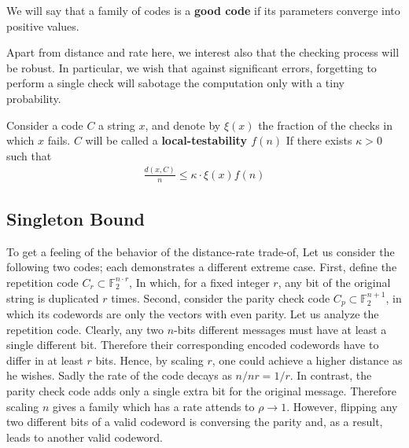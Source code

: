   \begin{definition} \label{good-code} We will say that a family of codes is a \textbf{good code} if its parameters converge into positive values. 
  \end{definition}

  Apart from distance and rate here, we interest also that the checking process will be robust. In particular,  we wish that against significant errors, forgetting to perform a single check will sabotage the computation only with a tiny probability.  
  \begin{definition} \label{LTC} Consider a code $C$  a string $x$, and denote by $\xi\left( x \right)$ the fraction of the checks in which $x$ fails. $C$ will be called a \textbf{local-testability $f\left( n \right)$} If there exists $\kappa > 0$ such that 
  \begin{equation*}
    \begin{split}
      \frac{d\left( x, C \right)}{n} \le \kappa \cdot  \xi\left( x \right) f\left( n \right)
    \end{split}
  \end{equation*}
\end{definition}
  

  \subsection{Singleton Bound}  
  To get a feeling of the behavior of the distance-rate trade-of, Let us consider the following two codes; each demonstrates a different extreme case. First, define the repetition code $C_{r} \subset \mathbb{F}_{2}^{n \cdot r}$, In which, for a fixed integer $r$, any bit of the original string is duplicated $r$ times. Second, consider the parity check code $C_{p} \subset \mathbb{F}_{2}^{n+1}$, in which its codewords are only the vectors with even parity. Let us analyze the repetition code. Clearly, any two $n$-bits different messages must have at least a single different bit. Therefore their corresponding encoded codewords have to differ in at least $r$ bits. Hence, by scaling $r$, one could achieve a higher distance as he wishes. Sadly the rate of the code decays as $n/nr = 1/r$. In contrast, the parity check code adds only a single extra bit for the original message. Therefore scaling $n$ gives a family which has a rate attends to $\rho \rightarrow 1$. However, flipping any two different bits of a valid codeword is conversing the parity and, as a result, leads to another valid codeword.


